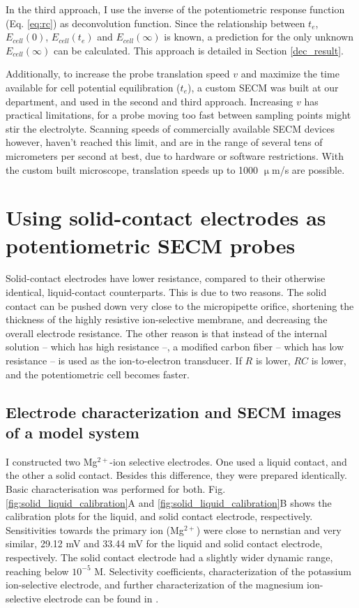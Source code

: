 In the third approach, I use the inverse of the potentiometric response function (Eq. \ref{eq:rc}) as deconvolution function.
Since the relationship between $t_e$, $E_{cell}(0)$, $E_{cell}(t_e)$ and $E_{cell}(\infty)$ is known, a prediction for the only unknown $E_{cell}(\infty)$ can be calculated.
This approach is detailed in Section \ref{dec_result}.

Additionally, to increase the probe translation speed $v$ and maximize the time available for cell potential equilibration ($t_e$), a custom SECM was built at our department, and used in the second and third approach.
Increasing $v$ has practical limitations, for a probe moving too fast between sampling points might stir the electrolyte.
Scanning speeds of commercially available SECM devices however, haven't reached this limit, and are in the range of several tens of micrometers per second at best, due to hardware or software restrictions.
With the custom built microscope, translation speeds up to 1000 $\upmu$m/s are possible.
	
	\newpage
	\section{Using solid-contact electrodes as potentiometric SECM probes}
	\label{solid_result}
Solid-contact electrodes have lower resistance, compared to their otherwise identical, liquid-contact counterparts.
This is due to two reasons.
The solid contact can be pushed down very close to the micropipette orifice, shortening the thickness of the highly resistive ion-selective membrane, and decreasing the overall electrode resistance.
The other reason is that instead of the internal solution -- which has high resistance --, a modified carbon fiber -- which has low resistance -- is used as the ion-to-electron transducer.
If $R$ is lower, $RC$ is lower, and the potentiometric cell becomes faster.


		\subsection{Electrode characterization and SECM images of a model system}
I constructed two Mg$^{2+}$-ion selective electrodes.
One used a liquid contact, and the other a solid contact.
Besides this difference, they were prepared identically.
Basic characterisation was performed for both.
Fig. \ref{fig:solid_liquid_calibration}A and \ref{fig:solid_liquid_calibration}B shows the calibration plots for the liquid, and solid contact electrode, respectively.
Sensitivities towards the primary ion (Mg$^{2+}$) were close to nernstian and very similar, 29.12 mV and 33.44 mV for the liquid and solid contact electrode, respectively.
The solid contact electrode had a slightly wider dynamic range, reaching below $10^{-5}$ M.
Selectivity coefficients, characterization of the potassium ion-selective electrode, and further characterization of the magnesium ion-selective electrode can be found in \cite{calugareanu2013ion}.

